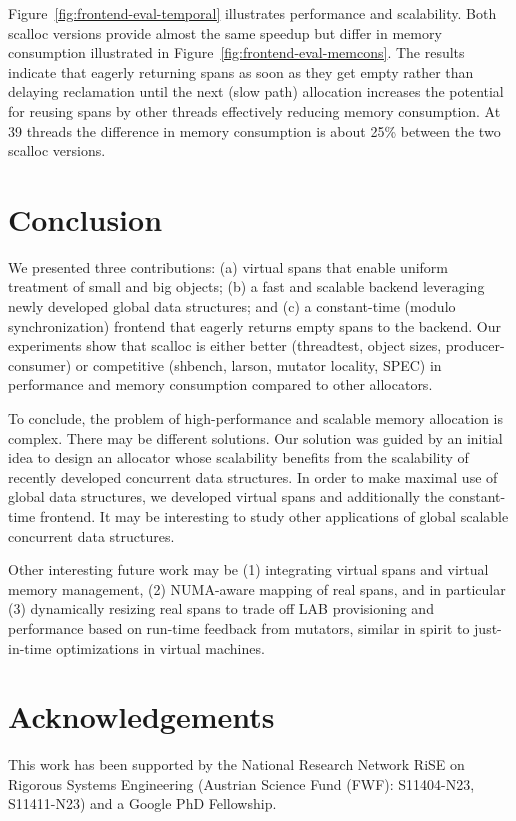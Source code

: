 \documentclass[10pt]{sigplanconf}
\begin{document}
Figure~\ref{fig:frontend-eval-temporal} illustrates performance and
scalability.  Both scalloc versions provide almost the same speedup
but differ in memory consumption illustrated in 
Figure~\ref{fig:frontend-eval-memcons}. 
The results indicate that eagerly returning spans as soon as they get
empty rather than delaying reclamation until the next (slow path) allocation
increases the potential for reusing spans by other threads effectively
reducing memory consumption.  At 39 threads the difference in memory
consumption is about 25\% between the two scalloc versions.


\section{Conclusion}

We presented three contributions: (a) virtual spans that enable uniform
treatment of small and big objects; (b) a fast and scalable backend leveraging
newly developed global data structures; and (c) a constant-time (modulo
synchronization) frontend that eagerly returns empty spans to the backend. Our
experiments show that scalloc is either better (threadtest, object sizes,
producer-consumer) or competitive (shbench, larson, mutator locality, SPEC) in
performance and memory consumption compared to other allocators.

To conclude, the problem of high-performance and scalable memory allocation is complex. There may be different solutions. Our solution was guided by an initial idea to design an allocator whose scalability benefits from the scalability of recently developed concurrent data structures. In order to make maximal use of global data structures, we developed virtual spans and additionally the constant-time frontend. It may be interesting to study other applications of global scalable concurrent data structures.

Other interesting future work may be
(1) integrating virtual spans and virtual memory management,
(2) NUMA-aware mapping of real spans, and in particular
(3) dynamically resizing real spans to trade off
LAB provisioning and performance based on run-time feedback
from mutators, similar in spirit to just-in-time optimizations
in virtual machines.

\section*{Acknowledgements}

This work has been supported by the National Research Network RiSE on Rigorous
Systems Engineering (Austrian Science Fund (FWF): S11404-N23,  S11411-N23) and
a Google PhD Fellowship.



\end{document}
